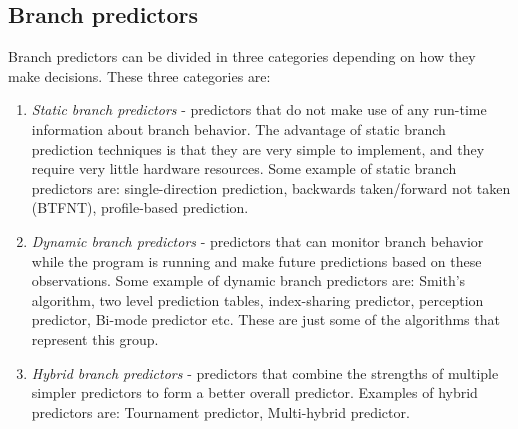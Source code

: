 \documentclass{scrreprt}
\begin{document}
\subsection*{Branch predictors}

Branch predictors can be divided in three categories depending on how they make decisions. These three categories are:
\begin{enumerate}
    \item \textit{Static branch predictors} - predictors that do not make use of any run-time information about branch behavior. The advantage of static branch prediction techniques is that they are very simple to implement, and they require very little hardware resources. Some example of static branch predictors are: single-direction prediction, backwards taken/forward not taken (BTFNT), profile-based prediction. 
    \item \textit{Dynamic branch predictors} - predictors that can monitor branch behavior while the program is running and make future predictions based on these observations. Some example of dynamic branch predictors are: Smith's algorithm, two level prediction tables, index-sharing predictor, perception predictor, Bi-mode predictor etc. These are just some of the algorithms that represent this group. 
    \item \textit{Hybrid branch predictors} - predictors that combine the strengths of multiple simpler predictors to form a better overall predictor. Examples of hybrid predictors are: Tournament predictor, Multi-hybrid predictor.
\end{enumerate}
\end{document}
